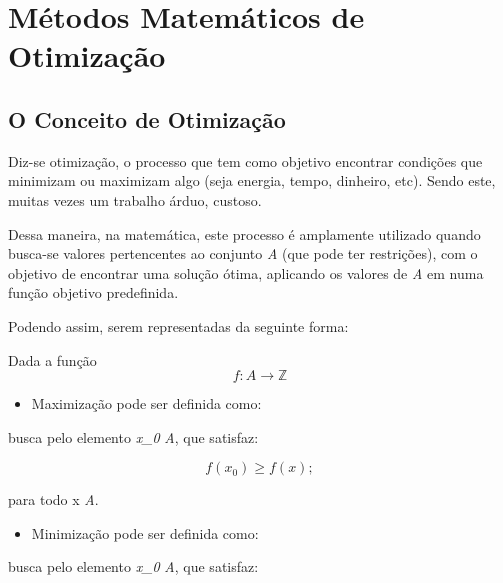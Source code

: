 

\chapter{\Large{Métodos Matemáticos de Otimização}}\label{chp:1}


\section{{O Conceito de Otimização}}

\hspace{0.8cm}
Diz-se otimização, o processo que tem como objetivo encontrar condições que
minimizam ou maximizam algo (seja energia, tempo, dinheiro, etc). Sendo este,
muitas vezes um trabalho árduo, custoso.

Dessa maneira, na matemática, este processo é amplamente utilizado quando
busca-se valores pertencentes ao conjunto \textit{A} (que pode ter
restrições), com o objetivo de encontrar uma solução ótima, aplicando os valores
de \textit{A} em numa função objetivo predefinida.

Podendo assim, serem representadas da seguinte forma:

	Dada a função
	\begin{equation}
		f : A \rightarrow \mathbb{Z}
	\end{equation}

	\begin{itemize}
		\item Maximização pode ser definida como:
	\end{itemize}

		busca pelo elemento \textit{x_0} \in \textit{A}, que satisfaz:

			\begin{equation}
				f(x_0) \geq f(x);
			\end{equation}

		para todo x \in \textit{A}.\\


	\begin{itemize}
		\item Minimização pode ser definida como:
	\end{itemize}

		busca pelo elemento \textit{x_0} \in \textit{A}, que satisfaz:

